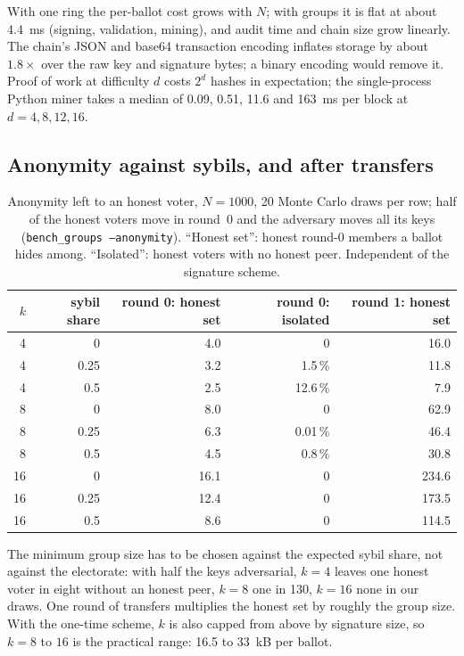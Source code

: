 \documentclass[11pt,a4paper]{article}
\theoremstyle{definition}
\begin{document}
With one ring the per-ballot cost grows with $N$; with groups it is flat
at about 4.4~ms (signing, validation, mining), and audit time and chain
size grow linearly. The chain's JSON and base64 transaction encoding
inflates storage by about $1.8\times$ over the raw key and signature
bytes; a binary encoding would remove it. Proof of work at difficulty
$d$ costs $2^d$ hashes in expectation; the single-process Python miner
takes a median of 0.09, 0.51, 11.6 and 163~ms per block at $d = 4, 8, 12,
16$.

\subsection{Anonymity against sybils, and after transfers}

\begin{table}[h]
\centering
\caption{Anonymity left to an honest voter, $N = 1000$, 20 Monte Carlo
draws per row; half of the honest voters move in round~0 and the
adversary moves all its keys (\texttt{bench\_groups --anonymity}).
``Honest set'': honest round-0 members a ballot hides among.
``Isolated'': honest voters with no honest peer. Independent of the
signature scheme.}
\label{tab:anon}
\small
\begin{tabular}{rrrrr}
\toprule
$k$ & sybil share & round 0: honest set & round 0: isolated & round 1: honest set \\
\midrule
4  & 0    & 4.0  & 0        & 16.0 \\
4  & 0.25 & 3.2  & 1.5\,\%  & 11.8 \\
4  & 0.5  & 2.5  & 12.6\,\% & 7.9 \\
8  & 0    & 8.0  & 0        & 62.9 \\
8  & 0.25 & 6.3  & 0.01\,\% & 46.4 \\
8  & 0.5  & 4.5  & 0.8\,\%  & 30.8 \\
16 & 0    & 16.1 & 0        & 234.6 \\
16 & 0.25 & 12.4 & 0        & 173.5 \\
16 & 0.5  & 8.6  & 0        & 114.5 \\
\bottomrule
\end{tabular}
\end{table}

The minimum group size has to be chosen against the expected sybil share,
not against the electorate: with half the keys adversarial, $k = 4$ leaves
one honest voter in eight without an honest peer, $k = 8$ one in 130,
$k = 16$ none in our draws. One round of transfers multiplies the honest
set by roughly the group size. With the one-time scheme, $k$ is also
capped from above by signature size, so $k = 8$ to $16$ is the practical
range: 16.5 to 33~kB per ballot.
\end{document}
